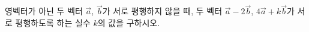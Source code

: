 영벡터가 아닌 두 벡터 $\vec{a}$, $\vec{b}$가 서로 평행하지 않을 때, 두 벡터 $\vec{a}-2\vec{b}$, $4\vec{a}+k\vec{b}$가 서로 평행하도록 하는 실수 $k$의 값을 구하시오.
